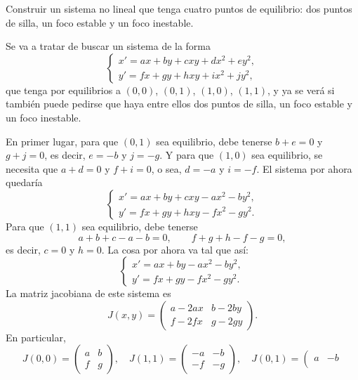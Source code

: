 \documentclass[11pt]{report}
\begin{document}
\begin{exercise}
    Construir un sistema no lineal que tenga cuatro puntos de equilibrio: dos puntos de silla, un foco estable y un foco inestable.
\end{exercise}

\begin{solution}
    Se va a tratar de buscar un sistema de la forma
    \[\begin{cases}
        x' = ax+by+cxy+dx^2+ey^2, \\
        y' = fx+gy+hxy+ix^2+jy^2,
    \end{cases}\]
    que tenga por equilibrios a $(0,0)$, $(0,1)$, $(1,0)$, $(1,1)$, y ya se verá si también puede pedirse que haya entre ellos dos puntos de silla, un foco estable y un foco inestable.
    
    En primer lugar, para que $(0,1)$ sea equilibrio, debe tenerse $b+e = 0$ y $g+j = 0$, es decir, $e = -b$ y $j = -g$. Y para que $(1,0)$ sea equilibrio, se necesita que $a+d = 0$ y $f+i = 0$, o sea, $d = -a$ y $i = -f$. El sistema por ahora quedaría 
    \[\begin{cases}
        x' = ax+by+cxy-ax^2-by^2, \\
        y' = fx+gy+hxy-fx^2-gy^2.
    \end{cases}\]
    Para que $(1,1)$ sea equilibrio, debe tenerse
    \[a+b+c-a-b = 0, \qquad f+g+h-f-g = 0,\]
    es decir, $c = 0$ y $h = 0$. La cosa por ahora va tal que así:
    \[\begin{cases}
        x' = ax+by-ax^2-by^2, \\
        y' = fx+gy-fx^2-gy^2.
    \end{cases}\]
    La matriz jacobiana de este sistema es
    \[J(x,y) = \left(\begin{array}{cc}
        a-2ax & b-2by \\
        f-2fx & g-2gy
    \end{array}\right).\]
    En particular,
    \[
        J(0,0) = \left(\begin{array}{cc}
            a & b \\
            f & g
        \end{array}\right), \quad J(1,1) = \left(\begin{array}{cc}
            -a & -b \\
            -f & -g
        \end{array}\right), \quad
        J(0,1) = \left(\begin{array}{cc}
            a & -b \\

\end{array}\]
\end{solution}
\end{document}
